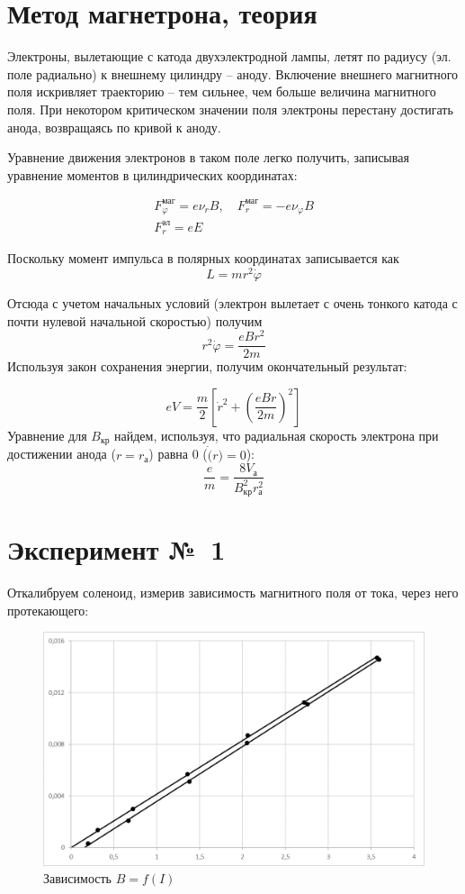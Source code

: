 \documentclass[a4paper, 12pt]{article}
\begin{document}
\section*{Метод магнетрона, теория}
Электроны, вылетающие с катода двухэлектродной лампы, летят по радиусу (эл. поле радиально) к внешнему цилиндру -- аноду. Включение внешнего магнитного поля искривляет траекторию -- тем сильнее, чем больше величина магнитного поля. При некотором критическом значении поля электроны перестану достигать анода, возвращаясь по кривой к аноду. 

Уравнение движения электронов в таком поле легко получить, записывая уравнение моментов в цилиндрических координатах:

\begin{gather*}
F_\varphi^{\text{маг}} = e\nu_rB, \quad F_r^{\text{маг}} = -e\nu_\varphi B\\
F_r^{\text{эл}} = eE
\end{gather*}

Поскольку момент импульса в полярных координатах записывается как
$$L=mr^2\dot{\varphi}$$

Отсюда с учетом начальных условий (электрон вылетает с очень тонкого катода с почти нулевой начальной скоростью) получим
$$r^2\dot{\varphi} = \frac{eBr^2}{2m}$$
Используя закон сохранения энергии, получим окончательный результат:

$$eV=\frac{m}{2}\left[\dot{r}^2+\left(\frac{eBr}{2m}\right)^2\right]$$
Уравнение для $B_\text{кр}$ найдем, используя, что радиальная скорость электрона при достижении анода ($r=r_{\text{а}}$) равна 0 ($\dot(r) = 0$):
$$\frac{e}{m}=\frac{8V_\text{а}}{B_\text{кр}^2 r_\text{а}^2}$$



\pagebreak
\section*{Эксперимент №~1}
Откалибруем соленоид, измерив зависимость магнитного поля от тока, через него протекающего:
\begin {figure}[H]
\begin{center}
\includegraphics[width=\textwidth]{graph1_gk}
\caption{Зависимость $B=f(I)$}
\end{center}
\end {figure}
\end{document}
